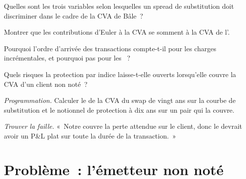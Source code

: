 \begin{exercise}[$\star$]\label{exo:rc:the-valuation-adjustment-desk:3}
Quelles sont les trois variables selon lesquelles un spread de substitution doit discriminer dans le cadre de la CVA
de Bâle~?
\end{exercise}

\begin{exercise}[$\star\star$]\label{exo:rc:the-valuation-adjustment-desk:4}
Montrer que les contributions d'Euler à la CVA se somment à la CVA de l'.
\end{exercise}

\begin{exercise}[$\star\star$]\label{exo:rc:the-valuation-adjustment-desk:5}
Pourquoi l'ordre d'arrivée des transactions compte-t-il pour les charges incrémentales, et pourquoi pas pour
les ~?
\end{exercise}

\begin{exercise}[$\star\star$]\label{exo:rc:the-valuation-adjustment-desk:6}
Quels risques la protection par indice laisse-t-elle ouverts lorsqu'elle couvre la CVA d'un client non noté~?
\end{exercise}

\begin{exercise}[$\star\star\star$]\label{exo:rc:the-valuation-adjustment-desk:7}
\emph{Programmation.} Calculer le  de la CVA du swap de vingt ans sur la courbe de substitution et le
notionnel de protection à dix ans sur un pair qui la couvre.
\end{exercise}

\begin{exercise}[$\star\star\star$]\label{exo:rc:the-valuation-adjustment-desk:8}
\emph{Trouver la faille.} «~Notre  couvre la perte attendue sur le client, donc le  devrait avoir un P\&L plat sur toute la durée de la transaction.~»
\end{exercise}

\section{Problème~: l'émetteur non noté}

